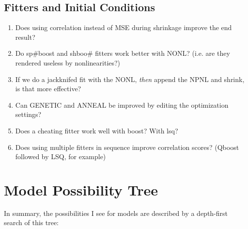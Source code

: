 \documentclass[11pt]{article}
\begin{document}
\subsection{Fitters and Initial Conditions}
\label{sec-3.8}

\begin{enumerate}
\item Does using correlation instead of MSE during shrinkage improve the end result?
\item Do sp\#boost and shboo\# fitters work better with NONL? (i.e. are they rendered useless by nonlinearities?)
\item If we do a jackknifed fit with the NONL, \emph{then} append the NPNL and shrink, is that more effective?
\item Can GENETIC and ANNEAL be improved by editing the optimization settings?
\item Does a cheating fitter work well with boost? With lsq?
\item Does using multiple fitters in sequence improve correlation scores? (Qboost followed by LSQ, for example)
\end{enumerate}
\pagebreak
\section{Model Possibility Tree}
\label{sec-4}


  In summary, the possibilities I see for models are described by a depth-first search of this tree:
  
\end{document}
